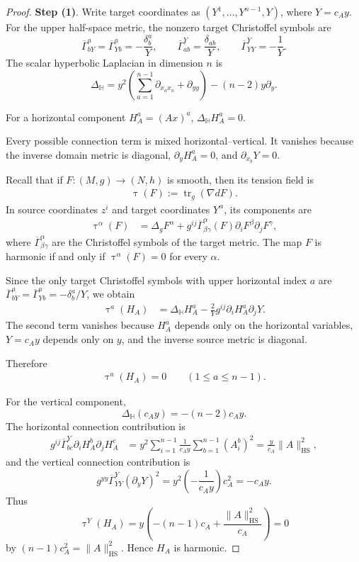 \documentclass[11pt]{amsart}
\theoremstyle{plain}
\theoremstyle{plain}
\theoremstyle{plain}
\newcommand{\HS}{\mathrm{HS}}
\DeclareMathOperator{\tension}{\tau}
\numberwithin{equation}{section}
\begin{document}
\begin{proof}
\textbf{Step (1)}. Write target coordinates as
\((Y^1,\dots,Y^{n-1},Y)\), where \(Y=c_Ay\).  For the upper half-space
metric, the nonzero target Christoffel symbols are
\[
\overline\Gamma^a_{bY}
=
\overline\Gamma^a_{Yb}
=-\frac{\delta^a_b}{Y},
\qquad
\overline\Gamma^Y_{ab}=\frac{\delta_{ab}}Y,
\qquad
\overline\Gamma^Y_{YY}=-\frac1Y.
\]
The scalar hyperbolic Laplacian in dimension \(n\) is
\[
\Delta_{\mathbb H}
=
y^2\left(\sum_{a=1}^{n-1}\partial_{x_ax_a}+\partial_{yy}\right)
-(n-2)y\partial_y.
\]

For a horizontal component \(H_A^a=(Ax)^a\),
\(\Delta_{\mathbb H}H_A^a=0\).  

Every possible connection term is mixed
horizontal--vertical.  It vanishes because the inverse domain metric is
diagonal, \(\partial_yH_A^a=0\), and \(\partial_{x_b}Y=0\).  

Recall that if \(F:(M,g)\to(N,h)\) is smooth, then its tension field is
\begin{align}
\tension(F):=\operatorname{tr}_g(\nabla dF).
\nonumber
\end{align}
In source coordinates \(z^i\) and target coordinates \(Y^\alpha\), its
components are
\begin{align}
\tension^\alpha(F)
&=
\Delta_gF^\alpha
+
g^{ij}\overline\Gamma^\alpha_{\beta\gamma}(F)
\partial_iF^\beta\partial_jF^\gamma,
\nonumber
\end{align}
where \(\overline\Gamma^\alpha_{\beta\gamma}\) are the Christoffel symbols
of the target metric.  The map \(F\) is harmonic if and only if
\(\tension^\alpha(F)=0\) for every \(\alpha\).

Since the only target Christoffel symbols
with upper horizontal index \(a\) are
\(\overline\Gamma^a_{bY}=\overline\Gamma^a_{Yb}=-\delta_b^a/Y\), we obtain
\begin{align}
\tension^a(H_A)
&=
\Delta_{\mathbb H}H_A^a
-\frac{2}{Y}g^{ij}\partial_iH_A^a\partial_jY.
\nonumber
\end{align}
The second term vanishes because \(H_A^a\) depends only on the horizontal
variables, \(Y=c_Ay\) depends only on \(y\), and the inverse source metric
is diagonal.  

Therefore
\begin{align}
\tension^a(H_A)=0
\qquad(1\leq a\leq n-1).
\nonumber
\end{align}

For the vertical component,
\[
\Delta_{\mathbb H}(c_Ay)=-(n-2)c_Ay.
\]
The horizontal connection contribution is
\[
\begin{aligned}
g^{ij}\overline\Gamma^Y_{bc}\partial_iH_A^b\partial_jH_A^c&=y^2\sum_{i=1}^{n-1}\frac1{c_Ay}
\sum_{b=1}^{n-1}(A_i^b)^2=\frac{y}{c_A}\|A\|_{\HS}^2,
\end{aligned}
\]
and the vertical connection contribution is
\[
g^{yy}\overline\Gamma^Y_{YY}(\partial_yY)^2
=
y^2\left(-\frac1{c_Ay}\right)c_A^2
=-c_Ay.
\]
Thus
\[
\tension^Y(H_A)
=
y\left(-(n-1)c_A+\frac{\|A\|_{\HS}^2}{c_A}\right)=0
\]
by \((n-1)c_A^2=\|A\|_{\HS}^2\).  Hence \(H_A\) is harmonic.


\end{proof}
\end{document}
